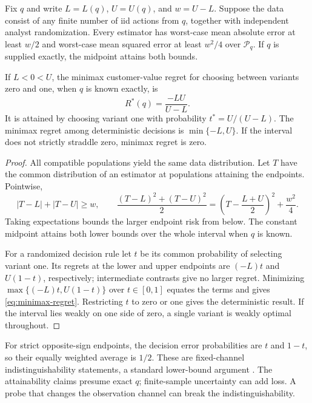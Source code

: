 \begin{theorem}
\label{thm:decision-loss}
Fix $q$ and write $L=L(q)$, $U=U(q)$, and $w=U-L$. Suppose the data consist of
any finite number of iid actions from $q$, together with independent analyst
randomization. Every estimator has worst-case mean absolute error at least
$w/2$ and worst-case mean squared error at least $w^2/4$ over $\mathcal P_q$.
If $q$ is supplied exactly, the midpoint attains both bounds.

If $L<0<U$, the minimax customer-value regret for choosing between variants zero
and one, when $q$ is known exactly, is
\begin{equation}
\label{eq:minimax-regret}
 R^*(q)=\frac{-LU}{U-L}.
\end{equation}
It is attained by choosing variant one with probability $t^*=U/(U-L)$.
The minimax regret among deterministic decisions is $\min\{-L,U\}$. If the
interval does not strictly straddle zero, minimax regret is zero.
\end{theorem}
\begin{proof}
All compatible populations yield the same data distribution. Let $T$ have the
common distribution of an estimator at populations attaining the endpoints.
Pointwise,
\[
 |T-L|+|T-U|\geq w,\qquad
 \frac{(T-L)^2+(T-U)^2}{2}
 =\left(T-\frac{L+U}{2}\right)^2+\frac{w^2}{4}.
\]
Taking expectations bounds the larger endpoint risk from below. The constant
midpoint attains both lower bounds over the whole interval when $q$ is known.

For a randomized decision rule let $t$ be its common probability of selecting
variant one. Its regrets at the lower and upper endpoints are $(-L)t$ and
$U(1-t)$, respectively; intermediate contrasts give no larger regret. Minimizing
$\max\{(-L)t,U(1-t)\}$ over $t\in[0,1]$ equates the terms and gives
\eqref{eq:minimax-regret}. Restricting $t$ to zero or one gives the deterministic
result. If the interval lies weakly on one side of zero, a single variant is
weakly optimal throughout.
\end{proof}

For strict opposite-sign endpoints, the decision error probabilities are $t$
and $1-t$, so their equally weighted average is $1/2$. These are fixed-channel
indistinguishability statements, a standard lower-bound argument
\citep{lattimore2020}. The attainability claims presume exact $q$; finite-sample
uncertainty can add loss. A probe that changes the observation channel can
break the indistinguishability.

